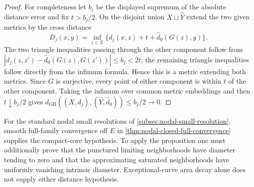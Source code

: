 \begin{proof}
For completeness let $b_j$ be the displayed supremum of the absolute distance error and fix $t>b_j/2$. On the disjoint union $X\sqcup\widehat Y$ extend the two given metrics by the cross distance
\[
 D_j(x,y)=\inf_{z\in X}
   \{d_j(x,z)+t+\widehat d_0(G(z),y)\}.
\]
The two triangle inequalities passing through the other component follow from
$|d_j(z,z')-\widehat d_0(G(z),G(z'))|\leq b_j<2t$; the remaining triangle inequalities follow directly from the infimum formula. Hence this is a metric extending both metrics. Since $G$ is surjective, every point of either component is within $t$ of the other component. Taking the infimum over common metric embeddings and then $t\downarrow b_j/2$ gives $d_{\mathrm{GH}}((X,d_j),(\widehat Y,\widehat d_0))\leq b_j/2\to0$.
\end{proof}

For the standard nodal small resolutions of \cref{subsec:nodal-small-resolution}, smooth full-family convergence off $E$ in \cref{thm:nodal-closed-full-convergence} supplies the compact-core hypothesis. To apply the proposition one must additionally prove that the punctured limiting neighborhoods have diameter tending to zero and that the approximating saturated neighborhoods have uniformly vanishing intrinsic diameter. Exceptional-curve area decay alone does not supply either distance hypothesis.
